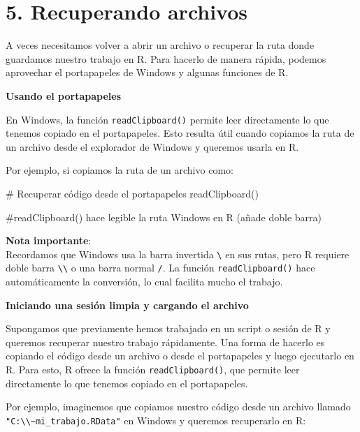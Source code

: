 \documentclass[
  letterpaper,
  DIV=11,
  numbers=noendperiod]{scrreprt}
\newenvironment{Shaded}{\begin{snugshade}}{\end{snugshade}}
\newcommand{\CommentTok}[1]{\textcolor[rgb]{0.37,0.37,0.37}{#1}}
\newcommand{\FunctionTok}[1]{\textcolor[rgb]{0.28,0.35,0.67}{#1}}
\newcommand{\NormalTok}[1]{\textcolor[rgb]{0.00,0.23,0.31}{#1}}
\begin{document}
\hypertarget{recuperando-archivos}{%
\section{5. Recuperando archivos}\label{recuperando-archivos}}

A veces necesitamos volver a abrir un archivo o recuperar la ruta donde
guardamos nuestro trabajo en R. Para hacerlo de manera rápida, podemos
aprovechar el portapapeles de Windows y algunas funciones de R.

\textbf{Usando el portapapeles}

En Windows, la función \texttt{readClipboard()} permite leer
directamente lo que tenemos copiado en el portapapeles. Esto resulta
útil cuando copiamos la ruta de un archivo desde el explorador de
Windows y queremos usarla en R.

Por ejemplo, si copiamos la ruta de un archivo como:

\begin{Shaded}
\begin{Highlighting}[]
\CommentTok{\# Recuperar código desde el portapapeles}
\FunctionTok{readClipboard}\NormalTok{()}

\CommentTok{\#readClipboard() hace legible la ruta Windows en R (añade doble barra)}
\end{Highlighting}
\end{Shaded}

\textbf{Nota importante}:\\

Recordamos que Windows usa la barra invertida \texttt{\textbackslash{}}
en sus rutas, pero R requiere doble barra
\texttt{\textbackslash{}\textbackslash{}} o una barra normal \texttt{/}.
La función \texttt{readClipboard()} hace automáticamente la conversión,
lo cual facilita mucho el trabajo.

\textbf{Iniciando una sesión limpia y cargando el archivo}

Supongamos que previamente hemos trabajado en un script o sesión de R y
queremos recuperar nuestro trabajo rápidamente. Una forma de hacerlo es
copiando el código desde un archivo o desde el portapapeles y luego
ejecutarlo en R. Para esto, R ofrece la función
\texttt{readClipboard()}, que permite leer directamente lo que tenemos
copiado en el portapapeles.

Por ejemplo, imaginemos que copiamos nuestro código desde un archivo
llamado
\texttt{"C:\textbackslash{}\textbackslash{}\textasciitilde{}mi\_trabajo.RData"}
en Windows y queremos recuperarlo en R:
\end{document}
